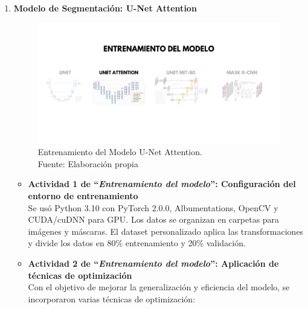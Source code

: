 \begin{enumerate}
\begin{itemize}
  \end{itemize}
\newpage
  \item \textbf{Modelo de Segmentación: U-Net Attention}
  \begin{figure}[H]
	\begin{center}
		\includegraphics[width=1\textwidth]{4/figures/entrunetat.png}
		\caption[Entrenamiento del Modelo U-Net Attention]{Entrenamiento del Modelo U-Net Attention.\\
		Fuente: Elaboración propia}
		\label{4:figentunetat}
	\end{center}
\end{figure}
  \begin{itemize}
  \item\textbf{Actividad 1 de “\textit{Entrenamiento del modelo}”: Configuración del entorno de entrenamiento}
\\
  Se usó Python 3.10 con PyTorch 2.0.0, Albumentations, OpenCV y CUDA/cuDNN para GPU. Los datos se organizan en carpetas para imágenes y máscaras. El dataset personalizado aplica las transformaciones y divide los datos en 80\% entrenamiento y 20\% validación.

  \item\textbf{Actividad 2 de “\textit{Entrenamiento del modelo}”: Aplicación de técnicas de optimización}
\\  
  Con el objetivo de mejorar la generalización y eficiencia del modelo, se incorporaron varias técnicas de optimización:


\end{itemize}
\end{enumerate}
